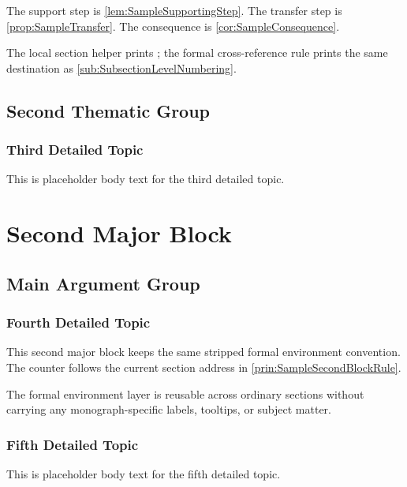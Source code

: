 \documentclass[12pt]{article}
\begin{document}
\begin{example}\label{ex:SampleUse}
The support step is \cref{lem:SampleSupportingStep}. The transfer step is
\cref{prop:SampleTransfer}. The consequence is \cref{cor:SampleConsequence}.
\end{example}

\begin{remark}
The local section helper prints ; the formal
cross-reference rule prints the same destination as
\cref{sub:SubsectionLevelNumbering}.
\end{remark}

\subsection{Second Thematic Group}
\subsubsection{Third Detailed Topic}
This is placeholder body text for the third detailed topic.

\section{Second Major Block}
\subsection{Main Argument Group}
\subsubsection{Fourth Detailed Topic}
This second major block keeps the same stripped formal environment convention.
The counter follows the current section address in
\cref{prin:SampleSecondBlockRule}.

\begin{principle}\label{prin:SampleSecondBlockRule}
The formal environment layer is reusable across ordinary sections without
carrying any monograph-specific labels, tooltips, or subject matter.
\end{principle}

\subsubsection{Fifth Detailed Topic}
This is placeholder body text for the fifth detailed topic.
\end{document}
